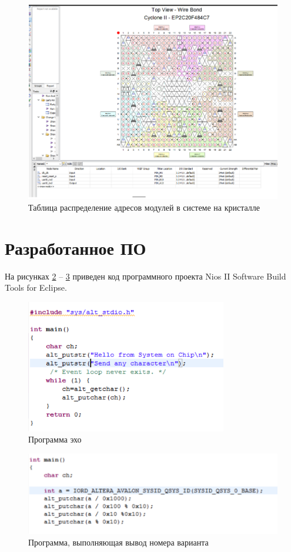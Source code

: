 \documentclass{article}
\begin{document}
\begin{figure}[h]
	\centering
	\includegraphics[scale=0.8]{tools/view.png}
	\caption{Таблица распределение адресов модулей в системе на кристалле}
	\label{view}
\end{figure}

\clearpage\section{Разработанное ПО}
На рисунках \ref{echo} -- \ref{variant} приведен код программного проекта Nios II Software Build Tools for 
Eclipse.
\begin{figure}[h]
	\centering
	\includegraphics[scale=1]{tools/echo.png}
	\caption{Программа эхо}
	\label{echo}
\end{figure}

\begin{figure}[h]
	\centering
	\includegraphics[scale=1]{tools/variant.png}
	\caption{Программа, выполняющая вывод номера варианта}
	\label{variant}
\end{figure}
\end{document}
